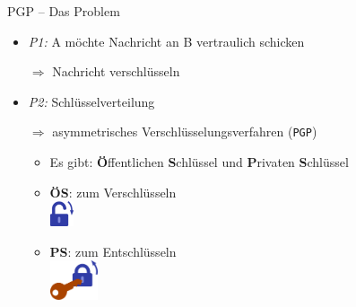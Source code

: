 \documentclass{beamer}
\begin{document}

\begin{frame}{PGP – Das Problem}

  \begin{itemize}
   \item \textit{P1:} A möchte Nachricht an B vertraulich schicken\\
   \item[$\Rightarrow$] Nachricht verschlüsseln

   \pause

   \vspace*{.5\baselineskip}

   \item\textit{P2:} Schlüsselverteilung\\
   \item[$\Rightarrow$] asymmetrisches Verschlüsselungsverfahren (\texttt{PGP})
   \begin{itemize}
    \item Es gibt: \textbf{Ö}ffentlichen \textbf{S}chlüssel und \textbf{P}rivaten \textbf{S}chlüssel

    \pause

    \vspace*{.5\baselineskip}

    \item \textbf{ÖS}: zum Verschlüsseln\\
    {\vspace*{4mm}\hspace{12mm}\includegraphics[width=7mm]{img-src/padlock-lock}}


    \item \textbf{PS}: zum Entschlüsseln\\
    {\vspace*{4mm}\hspace{5mm}\includegraphics[width=14mm]{img-src/padlock-unlock-with-key}}

   \end{itemize}
  \end{itemize}


\end{frame}
\end{document}
